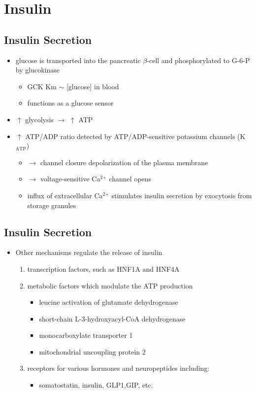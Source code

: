 \documentclass{scrartcl}
\begin{document}
\section{Insulin}
\label{sec:orge745bcb}
\subsection{Insulin Secretion}
\label{sec:org7e0b8a7}
\begin{itemize}
\item glucose is transported into the pancreatic \(\beta\)-cell and phosphorylated to G-6-P by glucokinase
\begin{itemize}
\item GCK Km \(\sim\) [glucose] in  blood
\item functions as a glucose sensor
\end{itemize}
\item \(\uparrow\) glycolysis \(\to\) \(\uparrow\) ATP
\item \(\uparrow\) ATP/ADP ratio detected by ATP/ADP-sensitive potassium channels (K\(_{\text{ATP}}\))
\begin{itemize}
\item \(\to\) channel closure depolarization of the plasma membrane
\item \(\to\) voltage-sensitive Ca\(^{\text{2+}}\) channel opens
\item influx of extracellular Ca\(^{\text{2+}}\) stimulates insulin secretion by
exocytosis from storage granules
\end{itemize}
\end{itemize}

\subsection{Insulin Secretion}
\label{sec:orgd7bb743}
\begin{itemize}
\item Other mechanisms regulate the release of insulin
\begin{enumerate}
\item transcription factors, such as HNF1A and HNF4A

\item metabolic factors which modulate the ATP production
\begin{itemize}
\item leucine activation of glutamate dehydrogenase
\item short-chain L-3-hydroxyacyl-CoA dehydrogenase
\item monocarboxylate transporter 1
\item mitochondrial uncoupling protein 2
\end{itemize}
\item receptors for various hormones and neuropeptides including:
\begin{itemize}
\item somatostatin, insulin, GLP1,GIP, etc.
\end{itemize}
\end{enumerate}
\end{itemize}
\end{document}
